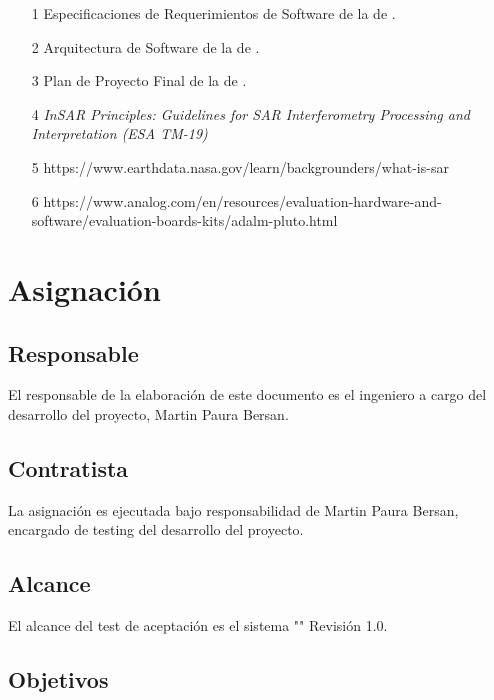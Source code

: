 \documentclass[
11pt, %
]{charter}
\begin{document}
\begin{enumerate}
\item [1]Especificaciones de Requerimientos de Software de la \degreename de \authorname.
\item [2]Arquitectura de Software de la \degreename de \authorname.
\item [3]Plan de Proyecto Final de la \degreename de \authorname.
\item [4]\textit{InSAR Principles: Guidelines for SAR Interferometry Processing and Interpretation (ESA TM-19)}
\item [5]https://www.earthdata.nasa.gov/learn/backgrounders/what-is-sar
\item [6]https://www.analog.com/en/resources/evaluation-hardware-and-software/evaluation-boards-kits/adalm-pluto.html
\end{enumerate}



\section{Asignación}
\label{sec:orgc1c4017}


\subsection{Responsable}
\label{sec:orgaf51da6}

El responsable de la elaboración de este documento es el ingeniero a cargo del desarrollo del proyecto, Martin Paura Bersan.


\subsection{Contratista}
\label{sec:orga40b0ee}

La asignación es ejecutada bajo responsabilidad de Martin Paura Bersan, encargado de testing del desarrollo del proyecto.

\subsection{Alcance}
\label{sec:org5ca5790}

El alcance del test de aceptación es el sistema "\ttitle" Revisión 1.0.


\subsection{Objetivos}
\label{sec:org0ae23fe}
\end{document}
